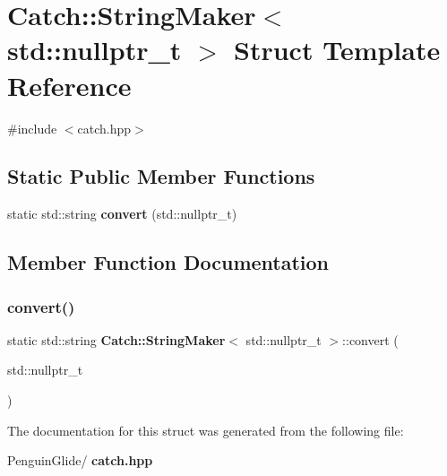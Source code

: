 \section{Catch\+::String\+Maker$<$ std\+::nullptr\+\_\+t $>$ Struct Template Reference}
\label{struct_catch_1_1_string_maker_3_01std_1_1nullptr__t_01_4}


{\ttfamily \#include $<$catch.\+hpp$>$}

\subsection*{Static Public Member Functions}
\begin{DoxyCompactItemize}
\item 
static std\+::string \textbf{ convert} (std\+::nullptr\+\_\+t)
\end{DoxyCompactItemize}


\subsection{Member Function Documentation}
\mbox{\label{struct_catch_1_1_string_maker_3_01std_1_1nullptr__t_01_4_a131fbb1f5cd68c93aaf30d34e3519e9c}} 
\subsubsection{convert()}
{\footnotesize\ttfamily static std\+::string \textbf{ Catch\+::\+String\+Maker}$<$ std\+::nullptr\+\_\+t $>$\+::convert (\begin{DoxyParamCaption}\item[{std\+::nullptr\+\_\+t}]{ }\end{DoxyParamCaption})\hspace{0.3cm}{\ttfamily [static]}}



The documentation for this struct was generated from the following file\+:\begin{DoxyCompactItemize}
\item 
Penguin\+Glide/\textbf{ catch.\+hpp}\end{DoxyCompactItemize}
